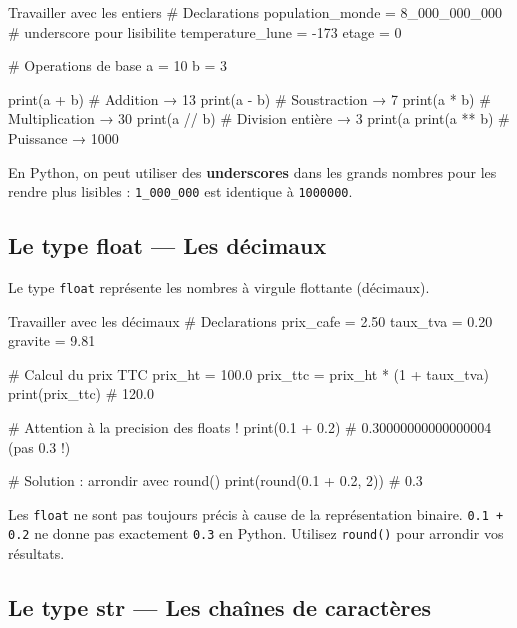 \documentclass[12pt, a4paper]{article}
\begin{document}
\begin{codeblock}{Travailler avec les entiers}
# Declarations
population_monde = 8_000_000_000   # underscore pour lisibilite
temperature_lune = -173
etage = 0

# Operations de base
a = 10
b = 3

print(a + b)   # Addition      → 13
print(a - b)   # Soustraction  → 7
print(a * b)   # Multiplication → 30
print(a // b)  # Division entière → 3
print(a %
print(a ** b)  # Puissance     → 1000
\end{codeblock}

\begin{boiteRetenir}
En Python, on peut utiliser des \textbf{underscores} dans les grands nombres pour les rendre plus lisibles : \texttt{1\_000\_000} est identique à \texttt{1000000}.
\end{boiteRetenir}

\subsection{Le type float — Les décimaux}

Le type \texttt{float} représente les nombres à virgule flottante (décimaux).

\begin{codeblock}{Travailler avec les décimaux}
# Declarations
prix_cafe = 2.50
taux_tva = 0.20
gravite = 9.81

# Calcul du prix TTC
prix_ht = 100.0
prix_ttc = prix_ht * (1 + taux_tva)
print(prix_ttc)   # 120.0

# Attention à la precision des floats !
print(0.1 + 0.2)  # 0.30000000000000004 (pas 0.3 !)

# Solution : arrondir avec round()
print(round(0.1 + 0.2, 2))  # 0.3
\end{codeblock}

\begin{boiteErreur}
Les \texttt{float} ne sont pas toujours précis à cause de la représentation binaire.
\texttt{0.1 + 0.2} ne donne pas exactement \texttt{0.3} en Python.
Utilisez \texttt{round()} pour arrondir vos résultats.
\end{boiteErreur}

\subsection{Le type str — Les chaînes de caractères}
\end{document}
